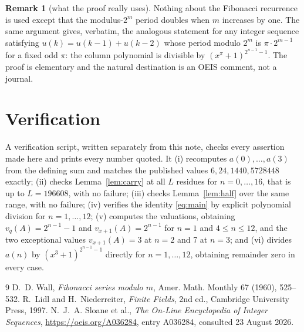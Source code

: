 \documentclass[11pt,a4paper]{article}
\theoremstyle{plain}
\theoremstyle{definition}
\newtheorem{remark}[theorem]{Remark}
\begin{document}
\begin{remark}[what the proof really uses]
Nothing about the Fibonacci recurrence is used except that the modulus-$2^{m}$ period
doubles when $m$ increases by one. The same argument gives, verbatim, the analogous
statement for any integer sequence satisfying $u(k)=u(k-1)+u(k-2)$ whose period modulo
$2^{m}$ is $\pi\cdot2^{m-1}$ for a fixed odd $\pi$: the column polynomial is divisible by
$(x^{\pi}+1)^{2^{n-1}-1}$. The proof is elementary and the natural destination is an OEIS
comment, not a journal.
\end{remark}

\section{Verification}

A verification script, written separately from this note, checks every assertion made here
and prints every number quoted. It (i) recomputes $a(0),\dots,a(3)$ from the defining sum
and matches the published values $6,24,1440,5728448$ exactly; (ii) checks
Lemma~\ref{lem:carry} at all $L$ residues for $n=0,\dots,16$, that is up to $L=196608$,
with no failure; (iii) checks Lemma~\ref{lem:half} over the same range, with no failure;
(iv) verifies the identity \eqref{eq:main} by explicit polynomial division for
$n=1,\dots,12$; (v) computes the valuations, obtaining $v_{q}(A)=2^{n-1}-1$ and
$v_{x+1}(A)=2^{n-1}$ for $n=1$ and $4\le n\le12$, and the two exceptional values
$v_{x+1}(A)=3$ at $n=2$ and 7 at $n=3$; and (vi) divides $a(n)$ by $(x^{3}+1)^{2^{n-1}-1}$
directly for $n=1,\dots,12$, obtaining remainder zero in every case.

\begin{thebibliography}{9}
 D.~D. Wall, \emph{Fibonacci series modulo $m$}, Amer. Math. Monthly 67
(1960), 525--532.
 R.~Lidl and H.~Niederreiter, \emph{Finite Fields}, 2nd ed., Cambridge
University Press, 1997.
 N.~J.~A. Sloane et al., \emph{The On-Line Encyclopedia of Integer
Sequences}, \url{https://oeis.org/A036284}, entry A036284, consulted 23 August 2026.
\end{thebibliography}
\end{document}
